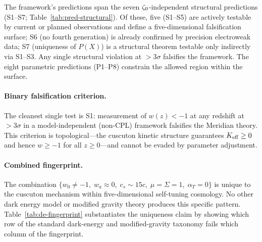 The framework's predictions span the seven $\zeta_0$-independent structural predictions (S1--S7; Table~\ref{tab:pred-structural}). Of these, five (S1--S5) are actively testable by current or planned observations and define a five-dimensional falsification surface; S6 (no fourth generation) is already confirmed by precision electroweak data; S7 (uniqueness of $P(X)$) is a structural theorem testable only indirectly via S1--S3. Any single structural violation at $>3\sigma$ falsifies the framework. The eight parametric predictions (P1--P8) constrain the allowed region within the surface.

\paragraph{Binary falsification criterion.}
The cleanest single test is S1: measurement of $w(z) < -1$ at any redshift at $>3\sigma$ in a model-independent (non-CPL) framework falsifies the Meridian theory. This criterion is topological---the cuscuton kinetic structure guarantees $K_{\mathrm{eff}} \geq 0$ and hence $w \geq -1$ for all $z \geq 0$---and cannot be evaded by parameter adjustment.

\paragraph{Combined fingerprint.}
The combination $\{w_0 \neq -1,\; w_a \approx 0,\; c_s \sim 15c,\; \mu = \Sigma = 1,\; \alpha_T = 0\}$ is unique to the cuscuton mechanism within five-dimensional self-tuning cosmology. No other dark energy model or modified gravity theory produces this specific pattern. Table~\ref{tab:de-fingerprint} substantiates the uniqueness claim by showing which row of the standard dark-energy and modified-gravity taxonomy fails which column of the fingerprint.

